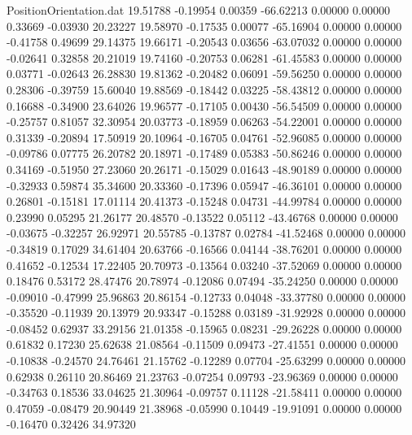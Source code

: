 \begin{filecontents}{PositionOrientation.dat}
  19.51788   -0.19954    0.00359   -66.62213    0.00000    0.00000    0.33669   -0.03930   20.23227
  19.58970   -0.17535    0.00077   -65.16904    0.00000    0.00000   -0.41758    0.49699   29.14375
  19.66171   -0.20543    0.03656   -63.07032    0.00000    0.00000   -0.02641    0.32858   20.21019
  19.74160   -0.20753    0.06281   -61.45583    0.00000    0.00000    0.03771   -0.02643   26.28830
  19.81362   -0.20482    0.06091   -59.56250    0.00000    0.00000    0.28306   -0.39759   15.60040
  19.88569   -0.18442    0.03225   -58.43812    0.00000    0.00000    0.16688   -0.34900   23.64026
  19.96577   -0.17105    0.00430   -56.54509    0.00000    0.00000   -0.25757    0.81057   32.30954
  20.03773   -0.18959    0.06263   -54.22001    0.00000    0.00000    0.31339   -0.20894   17.50919
  20.10964   -0.16705    0.04761   -52.96085    0.00000    0.00000   -0.09786    0.07775   26.20782
  20.18971   -0.17489    0.05383   -50.86246    0.00000    0.00000    0.34169   -0.51950   27.23060
  20.26171   -0.15029    0.01643   -48.90189    0.00000    0.00000   -0.32933    0.59874   35.34600
  20.33360   -0.17396    0.05947   -46.36101    0.00000    0.00000    0.26801   -0.15181   17.01114
  20.41373   -0.15248    0.04731   -44.99784    0.00000    0.00000    0.23990    0.05295   21.26177
  20.48570   -0.13522    0.05112   -43.46768    0.00000    0.00000   -0.03675   -0.32257   26.92971
  20.55785   -0.13787    0.02784   -41.52468    0.00000    0.00000   -0.34819    0.17029   34.61404
  20.63766   -0.16566    0.04144   -38.76201    0.00000    0.00000    0.41652   -0.12534   17.22405
  20.70973   -0.13564    0.03240   -37.52069    0.00000    0.00000    0.18476    0.53172   28.47476
  20.78974   -0.12086    0.07494   -35.24250    0.00000    0.00000   -0.09010   -0.47999   25.96863
  20.86154   -0.12733    0.04048   -33.37780    0.00000    0.00000   -0.35520   -0.11939   20.13979
  20.93347   -0.15288    0.03189   -31.92928    0.00000    0.00000   -0.08452    0.62937   33.29156
  21.01358   -0.15965    0.08231   -29.26228    0.00000    0.00000    0.61832    0.17230   25.62638
  21.08564   -0.11509    0.09473   -27.41551    0.00000    0.00000   -0.10838   -0.24570   24.76461
  21.15762   -0.12289    0.07704   -25.63299    0.00000    0.00000    0.62938    0.26110   20.86469
  21.23763   -0.07254    0.09793   -23.96369    0.00000    0.00000   -0.34763    0.18536   33.04625
  21.30964   -0.09757    0.11128   -21.58411    0.00000    0.00000    0.47059   -0.08479   20.90449
  21.38968   -0.05990    0.10449   -19.91091    0.00000    0.00000   -0.16470    0.32426   34.97320

\end{filecontents}
